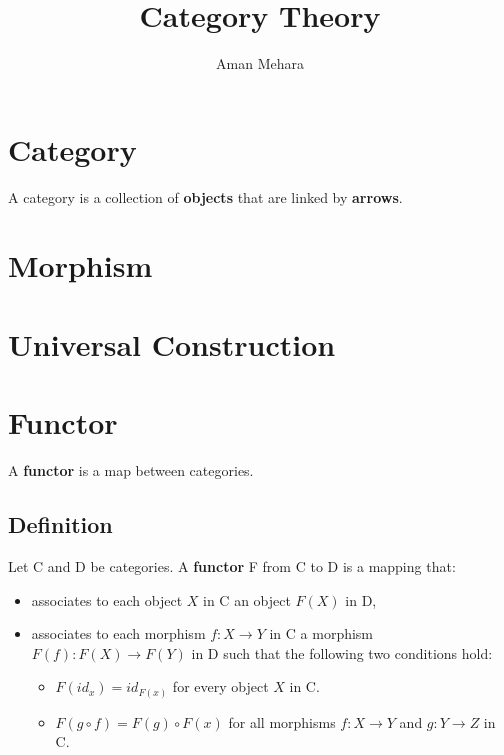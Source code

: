 \documentclass{article}
\begin{document}
\title{Category Theory}
\author{Aman Mehara}
\maketitle

\section{Category}
A category is a collection of \textbf{objects} that are linked by \textbf{arrows}.

\section{Morphism}

\section{Universal Construction}

\section{Functor}
A \textbf{functor} is a map between categories.

\subsection{Definition}
Let C and D be categories. A \textbf{functor} F from C to D is a mapping that:

\begin{itemize}

\item 
  associates to each object \(X\) in C an object \(F(X)\) in D,

\item
  associates to each morphism \(f\colon X \to Y\) in C a morphism 
  \(F(f)\colon F(X) \to F(Y)\) in D such that the following two conditions hold:

  \begin{itemize} 

  \item 
    \(F(id_{x}) = id_{F(x)}\) for every object \(X\) in C.
    
  \item
    \(F(g \circ f) = F(g) \circ F(x)\) for all morphisms \(f\colon X \to Y\) and 
    \(g\colon Y \to Z\) in C.

  \end{itemize}

\end{itemize}
\end{document}
